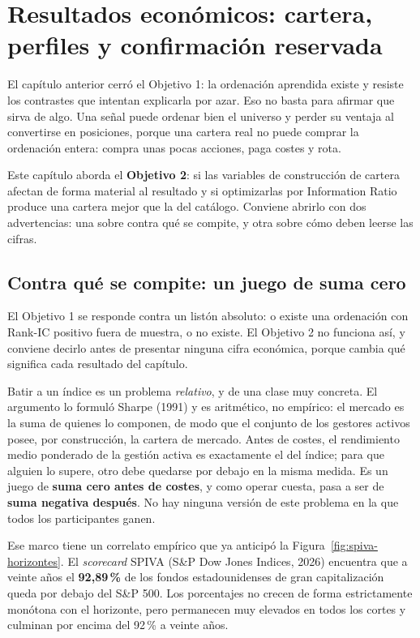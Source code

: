 \chapter{Resultados económicos: cartera, perfiles y confirmación reservada}
\label{chap:resultados-economicos}

El capítulo anterior cerró el Objetivo 1: la ordenación aprendida existe y resiste los contrastes que
intentan explicarla por azar. Eso no basta para afirmar que sirva de algo. Una señal puede ordenar
bien el universo y perder su ventaja al convertirse en posiciones, porque una cartera real no puede
comprar la ordenación entera: compra unas pocas acciones, paga costes y rota.

Este capítulo aborda el \textbf{Objetivo 2}: si las variables de construcción de cartera afectan de
forma material al resultado y si optimizarlas por Information Ratio produce una cartera mejor que la
del catálogo. Conviene abrirlo con dos advertencias: una sobre contra qué se compite, y otra sobre
cómo deben leerse las cifras.

\section{Contra qué se compite: un juego de suma cero}
\label{sec:suma-cero}

El Objetivo 1 se responde contra un listón absoluto: o existe una ordenación con Rank-IC positivo
fuera de muestra, o no existe. El Objetivo 2 no funciona así, y conviene decirlo antes de presentar
ninguna cifra económica, porque cambia qué significa cada resultado del capítulo.

Batir a un índice es un problema \emph{relativo}, y de una clase muy concreta. El argumento lo
formuló Sharpe (1991) y es aritmético, no empírico: el mercado es la suma de quienes lo componen, de
modo que el conjunto de los gestores activos posee, por construcción, la cartera de mercado. Antes de
costes, el rendimiento medio ponderado de la gestión activa es exactamente el del índice; para que
alguien lo supere, otro debe quedarse por debajo en la misma medida. Es un juego de \textbf{suma
cero antes de costes}, y como operar cuesta, pasa a ser de \textbf{suma negativa después}. No hay
ninguna versión de este problema en la que todos los participantes ganen.

Ese marco tiene un correlato empírico que ya anticipó la
Figura~\ref{fig:spiva-horizontes}. El \textit{scorecard} SPIVA (S\&P Dow Jones Indices, 2026)
encuentra que a veinte años el \textbf{92,89\,\%} de los fondos estadounidenses de gran
capitalización queda por debajo del S\&P 500. Los porcentajes no crecen de forma estrictamente
monótona con el horizonte, pero permanecen muy elevados en todos los cortes y culminan por encima
del 92\,\% a veinte años.

